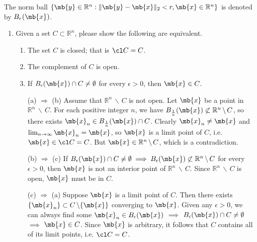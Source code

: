 \begin{exercise}
\begin{enumerate}
	\end{enumerate}
\end{exercise}


\newpage
\begin{exercise}
	The norm ball $\{\mb{y} \in \mathbb{R}^n:\|\mb{y}-\mb{x}\|_2<r, \mb{x}\in \mathbb{R}^n\}$ is denoted by $B_r(\mb{x})$.
	\begin{enumerate}

		\item Given a set $C \subset \mathbb{R}^n$, please show the following are equivalent.
			\begin{enumerate}
				\item The set $C$ is closed; that is $\cl C=C$.
				\item The complement of $C$ is open.
				\item If $B_{\epsilon}(\mb{x})\cap C \not=\emptyset$ for every $\epsilon>0$, then $\mb{x}\in C$.
			\end{enumerate}

			\begin{solution}
				\begin{itemize}
					\item []
					\item [(a) $\Rightarrow$ (b)]
						Assume that $\mathbb{R}^n\,\backslash\,C$ is not open.
						Let $\mb{x}$ be a point in $\mathbb{R}^n\,\backslash\,C$.
						For each positive integer $n$, we have $B_{\frac{1}{n}}(\mb{x}) \not\subset \mathbb{R}^n\,\backslash\,C$, so there exists $\mb{x}_n \in B_{\frac{1}{n}}(\mb{x})\cap C$.
						Clearly $\mb{x}_n \neq \mb{x}$ and $\lim_{n\to\infty}\mb{x}_n=\mb{x}$, so $\mb{x}$ is a limit point of $C$, i.e. $\mb{x}\in \cl C = C$.
						But $\mb{x}\in \mathbb{R}^n\,\backslash\,C$, which is a contradiction.
					\item [(b) $\Rightarrow$ (c)]
						If $B_\epsilon(\mb{x})\cap C \not=\emptyset \implies B_\epsilon(\mb{x})\not\subset \mathbb{R}^n\,\backslash\,C$ for every $\epsilon>0$, then $\mb{x}$ is not an interior point of $\mathbb{R}^n\,\backslash\,C$.
						Since $\mathbb{R}^n\,\backslash\,C$ is open, $\mb{x}$ must be in $C$.
					\item [(c) $\Rightarrow$ (a)]
						Suppose $\mb{x}$ is a limit point of $C$. Then there exists $\{\mb{x}_n\}\subset C \,\backslash \{\mb{x}\}$ converging to $\mb{x}$.
						Given any $\epsilon>0$, we can always find some $\mb{x}_n \in B_\epsilon(\mb{x})$ $\implies$ $B_\epsilon(\mb{x})\cap C \not=\emptyset$ $\implies$ $ \mb{x}\in C$.
						Since $\mb{x}$ is arbitrary, it follows that $C$ contains all of its limit points, i.e. $\cl C = C$.
						\qedhere
				\end{itemize}
			\end{solution}


\end{enumerate}
\end{exercise}
